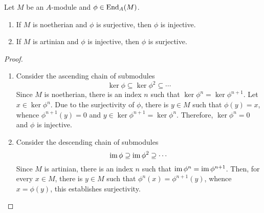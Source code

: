 \begin{proposition}
    Let $M$ be an $A$-module and $\phi\in\operatorname{End}_A(M)$. 
    \begin{enumerate}[label=(\alph*)]
        \item If $M$ is noetherian and $\phi$ is surjective, then $\phi$ is injective.
        \item If $M$ is artinian and $\phi$ is injective, then $\phi$ is surjective.
    \end{enumerate}
\end{proposition}
\begin{proof}
\begin{enumerate}[label=(\alph*)]
\item Consider the ascending chain of submodules
\begin{equation*}
    \ker\phi\subseteq\ker\phi^2\subseteq\cdots
\end{equation*}
Since $M$ is noetherian, there is an index $n$ such that $\ker\phi^n = \ker\phi^{n + 1}$. Let $x\in\ker\phi^n$. Due to the surjectivity of $\phi$, there is $y\in M$ such that $\phi(y) = x$, whence $\phi^{n + 1}(y) = 0$ and $y\in\ker\phi^{n + 1} = \ker\phi^n$. Therefore, $\ker\phi^n = 0$ and $\phi$ is injective.

\item Consider the descending chain of submodules
\begin{equation*}
    \operatorname{im}\phi\supseteq\operatorname{im}\phi^2\supseteq\cdots
\end{equation*}
Since $M$ is artinian, there is an index $n$ such that $\operatorname{im}\phi^n = \operatorname{im}\phi^{n + 1}$. Then, for every $x\in M$, there is $y\in M$ such that $\phi^n(x) = \phi^{n + 1}(y)$, whence $x = \phi(y)$, this establishes surjectivity.
\end{enumerate}
\end{proof}

